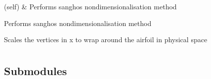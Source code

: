 \documentclass[letterpaper,10pt,english]{sphinxmanual}
\begin{document}
\begin{savenotes}\sphinxatlongtablestart\begin{longtable}[c]{}
\hline

\endfirsthead

%
{}\\
\hline

\endhead

\hline
{}\\
\endfoot

\endlastfoot

\sphinxAtStartPar
{\hyperref[\detokenize{autoapi/sangho_func/index:sangho_func.sangho}]{}}(self)
&
\sphinxAtStartPar
Performs sanghos non\sphinxhyphen{}dimensionalisation method
\\
\hline
\end{longtable}\sphinxatlongtableend\end{savenotes}

\begin{fulllineitems}
\label{\detokenize{autoapi/sangho_func/index:sangho_func.sangho}}
\sphinxAtStartPar
Performs sanghos non\sphinxhyphen{}dimensionalisation method

\sphinxAtStartPar
Scales the vertices in x to wrap around the airfoil in physical space

\end{fulllineitems}



\section{}
\label{\detokenize{autoapi/tests/index:module-tests}}\label{\detokenize{autoapi/tests/index:tests}}\label{\detokenize{autoapi/tests/index::doc}}

\subsection{Submodules}
\label{\detokenize{autoapi/tests/index:submodules}}
\end{document}
